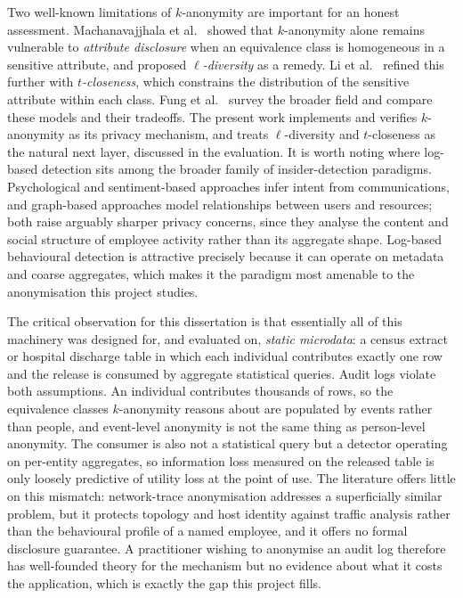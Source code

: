 \documentclass[10pt,a4paper]{article}
\begin{document}
Two well-known limitations of $k$-anonymity are important for an honest assessment. Machanavajjhala et al.\ \cite{ldiversity2007} showed that $k$-anonymity alone remains vulnerable to \emph{attribute disclosure} when an equivalence class is homogeneous in a sensitive attribute, and proposed \emph{$\ell$-diversity} as a remedy. Li et al.\ \cite{tcloseness2007} refined this further with \emph{$t$-closeness}, which constrains the distribution of the sensitive attribute within each class. Fung et al.\ \cite{fung2010} survey the broader field and compare these models and their tradeoffs. The present work implements and verifies $k$-anonymity as its privacy mechanism, and treats $\ell$-diversity and $t$-closeness as the natural next layer, discussed in the evaluation. It is worth noting where log-based detection sits among the broader family of insider-detection paradigms. Psychological and sentiment-based approaches infer intent from communications, and graph-based approaches model relationships between users and resources; both raise arguably sharper privacy concerns, since they analyse the content and social structure of employee activity rather than its aggregate shape. Log-based behavioural detection is attractive precisely because it can operate on metadata and coarse aggregates, which makes it the paradigm most amenable to the anonymisation this project studies.

The critical observation for this dissertation is that essentially all of this machinery was designed for, and evaluated on, \emph{static microdata}: a census extract or hospital discharge table in which each individual contributes exactly one row and the release is consumed by aggregate statistical queries. Audit logs violate both assumptions. An individual contributes thousands of rows, so the equivalence classes $k$-anonymity reasons about are populated by events rather than people, and event-level anonymity is not the same thing as person-level anonymity. The consumer is also not a statistical query but a detector operating on per-entity aggregates, so information loss measured on the released table is only loosely predictive of utility loss at the point of use. The literature offers little on this mismatch: network-trace anonymisation addresses a superficially similar problem, but it protects topology and host identity against traffic analysis rather than the behavioural profile of a named employee, and it offers no formal disclosure guarantee. A practitioner wishing to anonymise an audit log therefore has well-founded theory for the mechanism but no evidence about what it costs the application, which is exactly the gap this project fills.
\end{document}
